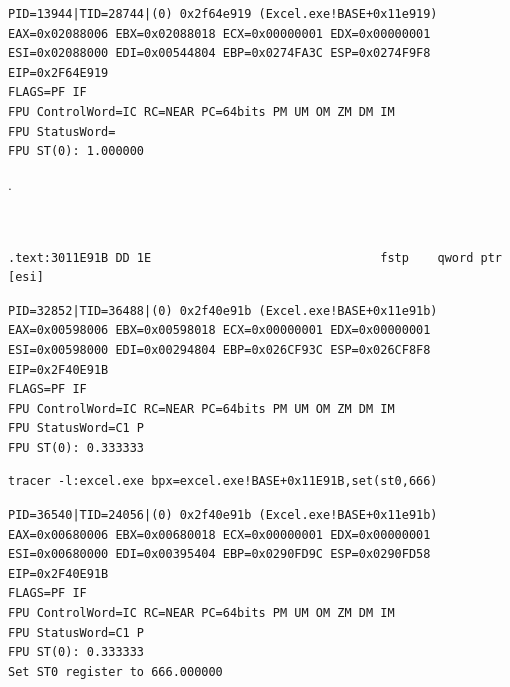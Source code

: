 \begin{lstlisting}
PID=13944|TID=28744|(0) 0x2f64e919 (Excel.exe!BASE+0x11e919)
EAX=0x02088006 EBX=0x02088018 ECX=0x00000001 EDX=0x00000001
ESI=0x02088000 EDI=0x00544804 EBP=0x0274FA3C ESP=0x0274F9F8
EIP=0x2F64E919
FLAGS=PF IF
FPU ControlWord=IC RC=NEAR PC=64bits PM UM OM ZM DM IM 
FPU StatusWord=
FPU ST(0): 1.000000
\end{lstlisting}

 \TT{[EBX]}.\\
\\
\\

\begin{lstlisting}
.text:3011E91B DD 1E                                fstp    qword ptr [esi]
\end{lstlisting}


\begin{lstlisting}
PID=32852|TID=36488|(0) 0x2f40e91b (Excel.exe!BASE+0x11e91b)
EAX=0x00598006 EBX=0x00598018 ECX=0x00000001 EDX=0x00000001
ESI=0x00598000 EDI=0x00294804 EBP=0x026CF93C ESP=0x026CF8F8
EIP=0x2F40E91B
FLAGS=PF IF
FPU ControlWord=IC RC=NEAR PC=64bits PM UM OM ZM DM IM 
FPU StatusWord=C1 P 
FPU ST(0): 0.333333
\end{lstlisting}


\begin{lstlisting}
tracer -l:excel.exe bpx=excel.exe!BASE+0x11E91B,set(st0,666)
\end{lstlisting}

\begin{lstlisting}
PID=36540|TID=24056|(0) 0x2f40e91b (Excel.exe!BASE+0x11e91b)
EAX=0x00680006 EBX=0x00680018 ECX=0x00000001 EDX=0x00000001
ESI=0x00680000 EDI=0x00395404 EBP=0x0290FD9C ESP=0x0290FD58
EIP=0x2F40E91B
FLAGS=PF IF
FPU ControlWord=IC RC=NEAR PC=64bits PM UM OM ZM DM IM 
FPU StatusWord=C1 P 
FPU ST(0): 0.333333
Set ST0 register to 666.000000
\end{lstlisting}


